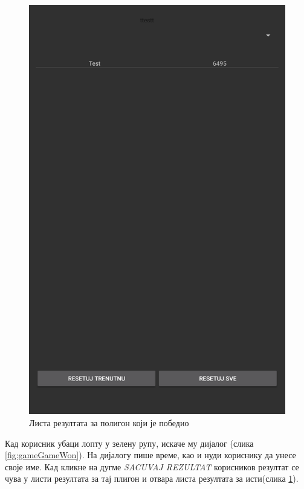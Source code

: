 \begin{figure}[htb!]
\begin{center}
\includegraphics[scale=.1]{pictures/game/gameHighScore}
\caption{Листа резултата за полигон који је победио}\label{fig:gameGameHighScore}
\end{center}
\end{figure}

Кад корисник убаци лопту у зелену рупу, искаче му дијалог (слика \ref{fig:gameGameWon}). На дијалогу пише време, као и нуди кориснику да унесе своје име. Кад кликне на дугме \emph{SACUVAJ REZULTAT} корисников резултат се чува у листи резултата за тај плигон и отвара листа резултата за исти(слика \ref{fig:gameGameHighScore}).
